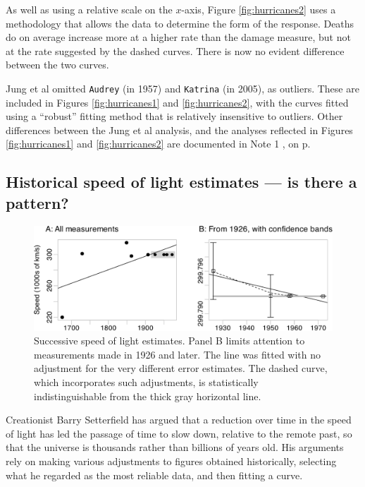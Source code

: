\documentclass[
  10pt,
  b5paper]{book}
\begin{document}
As well as using a relative scale on the \(x\)-axis, Figure
\ref{fig:hurricanes2} uses a methodology that allows the
data to determine the form of the response. Deaths do on
average increase more at a higher rate than the damage measure,
but not at the rate suggested by the dashed curves. There
is now no evident difference between the two curves.

Jung et al omitted \texttt{Audrey} (in 1957) and \texttt{Katrina} (in 2005), as
outliers. These are included in Figures \ref{fig:hurricanes1} and \ref{fig:hurricanes2}, with the curves fitted using a ``robust''
fitting method that is relatively insensitive to outliers.
Other differences between the Jung et al analysis, and the
analyses reflected in Figures \ref{fig:hurricanes1} and
\ref{fig:hurricanes2} are documented in Note 1
, on p.~\pageref{hurricanes}

\hypertarget{historical-speed-of-light-estimates-is-there-a-pattern}{%
\subsection*{Historical speed of light estimates --- is there a pattern?}\label{historical-speed-of-light-estimates-is-there-a-pattern}}

\begin{figure}[H]

{\centering \includegraphics{08-observational_files/figure-latex/plot-c-data-1} 

}

\caption{Successive speed of light estimates.  Panel B 
limits attention to measurements made in 1926 and later. 
The line was fitted with no adjustment for the very
different error estimates.  The dashed curve, which 
incorporates such adjustments, is statistically 
indistinguishable from the thick gray horizontal line.}\label{fig:plot-c-data}
\end{figure}

Creationist Barry Setterfield has argued that a reduction over
time in the speed of light has led the passage of time to slow
down, relative to the remote past, so that the universe is
thousands rather than billions of years old. His arguments rely
on making various adjustments to figures obtained historically,
selecting what he regarded as the most reliable data, and
then fitting a curve.
\end{document}

